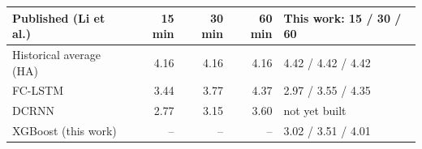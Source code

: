 \begin{tabular}{@{}lrrrl@{}}
\toprule
Published (Li et al.) & 15 min & 30 min & 60 min & This work: 15 / 30 / 60 \\
\midrule
Historical average (HA) \cite{li2018dcrnn} & 4.16 & 4.16 & 4.16 & 4.42 / 4.42 / 4.42 \\
FC-LSTM \cite{li2018dcrnn} & 3.44 & 3.77 & 4.37 & 2.97 / 3.55 / 4.35 \\
DCRNN \cite{li2018dcrnn} & 2.77 & 3.15 & 3.60 & not yet built \\
XGBoost (this work) & -- & -- & -- & 3.02 / 3.51 / 4.01 \\
\bottomrule
\end{tabular}
